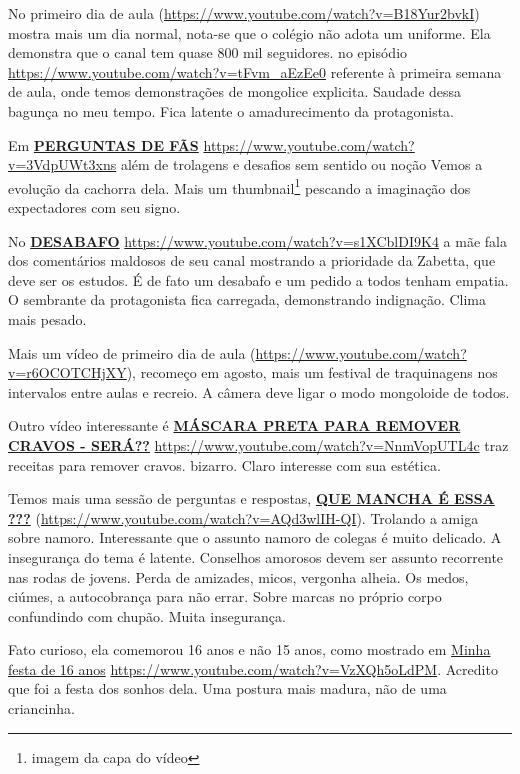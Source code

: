 No primeiro dia de aula (\url{https://www.youtube.com/watch?v=B18Yur2bvkI}) mostra mais um dia normal, nota-se que o colégio não adota um uniforme. Ela demonstra que o canal tem quase 800 mil seguidores. no episódio \url{https://www.youtube.com/watch?v=tFvm_aEzEe0} referente à primeira semana de aula, onde temos demonstrações de mongolice explicita. Saudade dessa bagunça no meu tempo. Fica latente o amadurecimento da protagonista.

Em \href{https://www.youtube.com/watch?v=3VdpUWt3xns}{\textbf{PERGUNTAS DE FÃS}} \url{https://www.youtube.com/watch?v=3VdpUWt3xns} além de trolagens e desafios sem sentido ou noção Vemos a evolução da cachorra dela. Mais um thumbnail\footnote{imagem da capa do vídeo} pescando a imaginação dos expectadores com seu signo.

No \href{https://www.youtube.com/watch?v=s1XCblDI9K4}{\textbf{DESABAFO}} \url{https://www.youtube.com/watch?v=s1XCblDI9K4} a mãe fala dos comentários maldosos de seu canal mostrando a prioridade da Zabetta, que deve ser os estudos. É de fato um desabafo e um pedido a todos tenham empatia. O sembrante da protagonista fica carregada, demonstrando indignação. Clima mais pesado.

Mais um vídeo de primeiro dia de aula (\url{https://www.youtube.com/watch?v=r6OCOTCHjXY}), recomeço em agosto, mais um festival de traquinagens nos intervalos entre aulas e recreio. A câmera deve ligar o modo mongoloide de todos.

Outro vídeo interessante é \href{https://www.youtube.com/watch?v=NnmVopUTL4c}{\textbf{MÁSCARA PRETA PARA REMOVER CRAVOS - SERÁ??}} \url{https://www.youtube.com/watch?v=NnmVopUTL4c} traz receitas para remover cravos. bizarro. Claro interesse com sua estética.

Temos mais uma sessão de perguntas e respostas, \href{https://www.youtube.com/watch?v=AQd3wlIH-QI}{\textbf{QUE MANCHA É ESSA ???}} (\url{https://www.youtube.com/watch?v=AQd3wlIH-QI}). Trolando a amiga sobre namoro. Interessante que o assunto namoro de colegas é muito delicado. A insegurança do tema é latente. Conselhos amorosos devem ser assunto recorrente nas rodas de jovens. Perda de amizades, micos, vergonha alheia. Os medos, ciúmes, a autocobrança para não errar. Sobre marcas no próprio corpo confundindo com chupão. Muita insegurança.

Fato curioso, ela comemorou 16 anos e não 15 anos, como mostrado em \href{https://www.youtube.com/watch?v=VzXQh5oLdPM}{Minha festa de 16 anos} \url{https://www.youtube.com/watch?v=VzXQh5oLdPM}. Acredito que foi a festa dos sonhos dela. Uma postura mais madura, não de uma criancinha.

